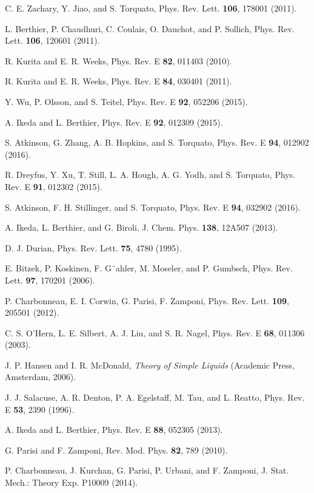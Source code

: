 \documentclass[aps,pre,twocolumn,superscriptaddress]{revtex4-1}
\begin{document}
\begin{thebibliography}{99}
C. E. Zachary, Y. Jiao, and S. Torquato, 
Phys. Rev. Lett. {\bf 106}, 178001 (2011).

L. Berthier, P. Chaudhuri, C. Coulais, O. Dauchot, and P. Sollich, 
Phys. Rev. Lett. {\bf 106}, 120601 (2011).

R. Kurita and E. R. Weeks, 
Phys. Rev. E {\bf 82}, 011403 (2010).

R. Kurita and E. R. Weeks, 
Phys. Rev. E {\bf 84}, 030401 (2011).

Y. Wu, P. Olsson, and S. Teitel, 
Phys. Rev. E {\bf 92}, 052206 (2015).

A. Ikeda and L. Berthier, 
Phys. Rev. E {\bf 92}, 012309 (2015).

S. Atkinson, G. Zhang, A. B. Hopkins, and S. Torquato, 
Phys. Rev. E {\bf 94}, 012902 (2016).

R. Dreyfus, Y. Xu, T. Still, L. A. Hough, A. G. Yodh, and S. Torquato, 
Phys. Rev. E {\bf 91}, 012302 (2015).

S. Atkinson, F. H. Stillinger, and S. Torquato, 
Phys. Rev. E {\bf 94}, 032902 (2016).

A. Ikeda, L. Berthier, and G. Biroli, 
J. Chem. Phys. {\bf 138}, 12A507 (2013).

D. J. Durian, 
Phys. Rev. Lett. {\bf 75}, 4780 (1995).

E. Bitzek, P. Koskinen, F. G¨ahler, M. Moseler, and P. Gumbsch,
Phys. Rev. Lett. {\bf 97}, 170201 (2006).

P. Charbonneau, E. I. Corwin, G. Parisi, F. Zamponi,
Phys. Rev. Lett. {\bf 109}, 205501 (2012). 

C. S. O'Hern, L. E. Silbert, A. J. Liu, and S. R. Nagel, 
Phys. Rev. E {\bf 68}, 011306 (2003).

J. P. Hansen and I. R. McDonald, {\it Theory of Simple Liquids}
(Academic Press, Amsterdam, 2006).

J. J. Salacuse, A. R. Denton, P. A. Egelstaff, M. Tau, and L. Reatto, 
Phys. Rev. E {\bf 53}, 2390 (1996).

A. Ikeda and L. Berthier, 
Phys. Rev. E {\bf 88}, 052305 (2013). 

G. Parisi and F. Zamponi, 
Rev. Mod. Phys. {\bf 82}, 789 (2010).

P. Charbonneau, J. Kurchan, G. Parisi, P. Urbani, and F. Zamponi, 
J. Stat. Mech.: Theory Exp. P10009 (2014).

\end{thebibliography}
\end{document}
